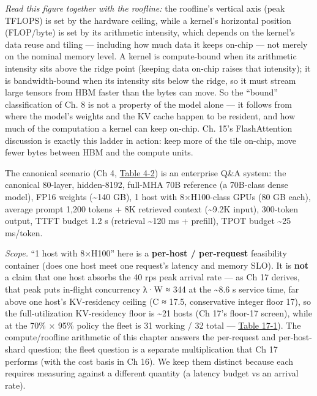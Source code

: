 \emph{Read this figure together with the roofline:} the roofline's
vertical axis (peak TFLOPS) is set by the hardware ceiling, while a
kernel's horizontal position (FLOP/byte) is set by its arithmetic
intensity, which depends on the kernel's data reuse and tiling ---
including how much data it keeps on-chip --- not merely on the nominal
memory level. A kernel is compute-bound when its arithmetic intensity
sits above the ridge point (keeping data on-chip raises that intensity);
it is bandwidth-bound when its intensity sits below the ridge, so it
must stream large tensors from HBM faster than the bytes can move. So
the ``bound'' classification of Ch. 8 is not a property of the model
alone --- it follows from where the model's weights and the KV cache
happen to be resident, and how much of the computation a kernel can keep
on-chip. Ch. 15's FlashAttention discussion is exactly this ladder in
action: keep more of the tile on-chip, move fewer bytes between HBM and
the compute units.

\label{worked-example-canonical-scenario-arithmetic}


The canonical scenario (Ch 4, \hyperref[tab:4.2]{Table 4-2}) is an enterprise Q\&A system:
the canonical 80-layer, hidden-8192, full-MHA 70B reference (a 70B-class
dense model), FP16 weights (\textasciitilde140 GB), 1 host with
8×H100-class GPUs (80 GB each), average prompt 1,200 tokens + 8K
retrieved context (\textasciitilde9.2K input), 300-token output, TTFT
budget 1.2 s (retrieval \textasciitilde120 ms + prefill), TPOT budget
\textasciitilde25 ms/token.

\emph{Scope.} ``1 host with 8×H100'' here is a \textbf{per-host /
per-request} feasibility container (does one host meet one request's
latency and memory SLO). It is \textbf{not} a claim that one host
absorbs the 40 rps peak arrival rate --- as Ch 17 derives, that peak
puts in-flight concurrency λ·W ≈ 344 at the \textasciitilde8.6 s service
time, far above one host's KV-residency ceiling (C ≈ 17.5, conservative
integer floor 17), so the full-utilization KV-residency floor is
\textasciitilde21 hosts (Ch 17's floor-17 screen), while at the 70\% ×
95\% policy the fleet is 31 working / 32 total --- \hyperref[tab:17.1]{Table 17-1}). The
compute/roofline arithmetic of this chapter answers the per-request and
per-host-shard question; the fleet question is a separate multiplication
that Ch 17 performs (with the cost basis in Ch 16). We keep them
distinct because each requires measuring against a different quantity (a
latency budget vs an arrival rate).


